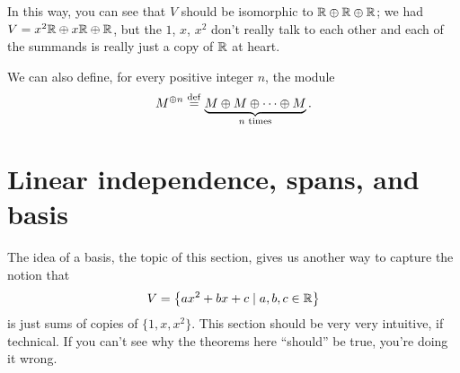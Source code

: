 In this way, you can see that $V$ should be isomorphic
to $\mathbb R \oplus \mathbb R \oplus \mathbb R$;
we had $V = x^2\mathbb R \oplus x\mathbb R \oplus \mathbb R$,
but the $1$, $x$, $x^2$ don't really talk to each other
and each of the summands is really just a copy of $\mathbb R$ at heart.

\begin{definition}
	We can also define, for every positive integer $n$, the module
	\[ M^{\oplus n}
		\overset{\mathrm{def}}{=} \underbrace{M \oplus M \oplus \dots \oplus M}_{\text{$n$ times}}. \]
\end{definition}

\section{Linear independence, spans, and basis}

The idea of a basis, the topic of this section,
gives us another way to capture the notion that
\[ V = \left\{ ax^2+bx+c \mid a,b,c \in \mathbb R \right\} \]
is just sums of copies of $\{1,x,x^2\}$.
This section should be very very intuitive, if technical.
If you can't see why the theorems here ``should'' be true,
you're doing it wrong.



